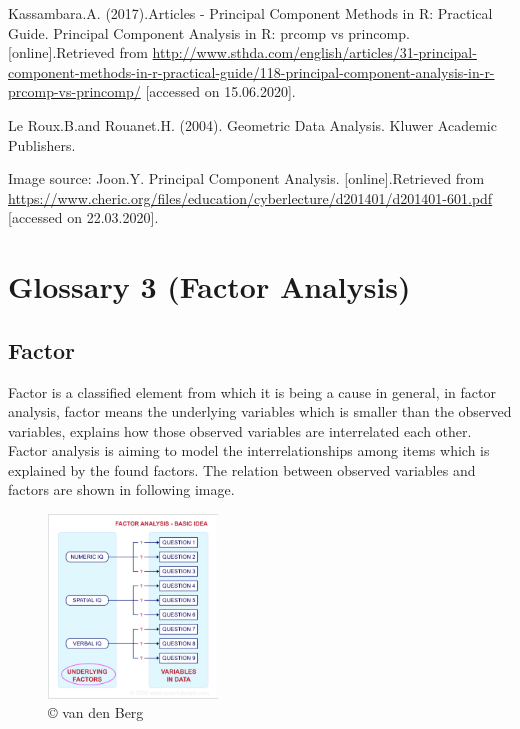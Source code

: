 \documentclass[]{book}
\begin{document}
Kassambara.A. (2017).Articles - Principal Component Methods in R: Practical Guide. Principal Component Analysis in R: prcomp vs princomp. {[}online{]}.Retrieved from \url{http://www.sthda.com/english/articles/31-principal-component-methods-in-r-practical-guide/118-principal-component-analysis-in-r-prcomp-vs-princomp/} {[}accessed on 15.06.2020{]}.

Le Roux.B.and Rouanet.H. (2004). Geometric Data Analysis. Kluwer Academic Publishers.

Image source: Joon.Y. Principal Component Analysis. {[}online{]}.Retrieved from \url{https://www.cheric.org/files/education/cyberlecture/d201401/d201401-601.pdf} {[}accessed on 22.03.2020{]}.

\hypertarget{glossary-3-factor-analysis}{%
\chapter{Glossary 3 (Factor Analysis)}\label{glossary-3-factor-analysis}}

\hypertarget{factor}{%
\section{Factor}\label{factor}}

Factor is a classified element from which it is being a cause in general, in factor analysis, factor means the underlying variables which is smaller than the observed variables, explains how those observed variables are interrelated each other.
Factor analysis is aiming to model the interrelationships among items which is explained by the found factors. The relation between observed variables and factors are shown in following image.

\begin{figure}
\centering
\includegraphics[width=0.4\textwidth,height=\textheight]{Factor.png}
\caption{© van den Berg}
\end{figure}
\end{document}
